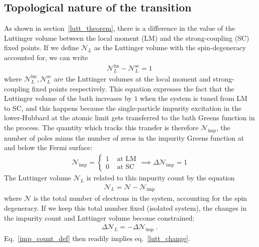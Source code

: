 \documentclass{report}
\numberwithin{equation}{section}
\begin{document}
\subsection{Topological nature of the transition}
As shown in section~\ref{lutt_theorem}, there is a difference in the value of the Luttinger volume between the local moment (LM) and the strong-coupling (SC) fixed points. If we define \(\mathcal{N}_L\) as the Luttinger volume with the spin-degeneracy accounted for, we can write
\begin{equation}\begin{aligned}
	\label{lutt_change}
	\mathcal{N}_L^\text{lm} - \mathcal{N}_L^\text{sc} = 1
\end{aligned}\end{equation}
where \(\mathcal{N}_L^\text{lm},\mathcal{N}_L^\text{sc}\) are the Luttinger volumes at the local moment and strong-coupling fixed points respectively. This equation expresses the fact that the Luttinger volume of the bath increases by \(1\) when the system is tuned from LM to SC, and this happens because the single-particle impurity excitation in the lower-Hubbard at the atomic limit gets transferred to the bath Greens function in the process. The quantity which tracks this transfer is therefore \(\mathcal{N}_\text{imp}\), the number of poles minus the number of zeros in the impurity Greens function at and below the Fermi surface:
\begin{equation}\begin{aligned}
	\label{imp_count_def}
	\mathcal{N}_\text{imp} = \begin{cases}
		1 & \text{ at LM}\\
		0 & \text{ at SC}
	\end{cases}\implies \Delta \mathcal{N}_\text{imp} = 1
\end{aligned}\end{equation}
The Luttinger volume \(\mathcal{N}_L\) is related to this impurity count by the equation
\begin{equation}\begin{aligned}
	\mathcal{N}_L = \mathcal{N} - \mathcal{N}_\text{imp}
\end{aligned}\end{equation}
where \(\mathcal{N}\) is the total number of electrons in the system, accounting for the spin degeneracy. If we keep this total number fixed (isolated system), the changes in the impurity count and Luttinger volume become constrained: 
\begin{equation}\begin{aligned}
	\Delta \mathcal{N}_L = - \Delta \mathcal{N}_\text{imp}~.
\end{aligned}\end{equation}
Eq.~\ref{imp_count_def} then readily implies eq.~\ref{lutt_change}.
\end{document}
